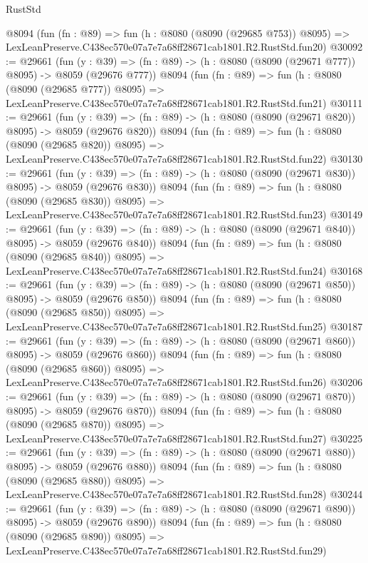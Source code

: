 \begin{lexlean}{RustStd}
\begin{coremodule}
    @8094
    (fun (fn : @89) =>
    fun (h : @8080 (@8090 (@29685 @753)) @8095) =>
    LexLeanPreserve.C438ec570e07a7e7a68ff28671cab1801.R2.RustStd.fun20)
@30092 := @29661
    (fun (y : @39) => (fn : @89) -> (h : @8080 (@8090 (@29671 @777)) @8095) -> @8059 (@29676 @777))
    @8094
    (fun (fn : @89) =>
    fun (h : @8080 (@8090 (@29685 @777)) @8095) =>
    LexLeanPreserve.C438ec570e07a7e7a68ff28671cab1801.R2.RustStd.fun21)
@30111 := @29661
    (fun (y : @39) => (fn : @89) -> (h : @8080 (@8090 (@29671 @820)) @8095) -> @8059 (@29676 @820))
    @8094
    (fun (fn : @89) =>
    fun (h : @8080 (@8090 (@29685 @820)) @8095) =>
    LexLeanPreserve.C438ec570e07a7e7a68ff28671cab1801.R2.RustStd.fun22)
@30130 := @29661
    (fun (y : @39) => (fn : @89) -> (h : @8080 (@8090 (@29671 @830)) @8095) -> @8059 (@29676 @830))
    @8094
    (fun (fn : @89) =>
    fun (h : @8080 (@8090 (@29685 @830)) @8095) =>
    LexLeanPreserve.C438ec570e07a7e7a68ff28671cab1801.R2.RustStd.fun23)
@30149 := @29661
    (fun (y : @39) => (fn : @89) -> (h : @8080 (@8090 (@29671 @840)) @8095) -> @8059 (@29676 @840))
    @8094
    (fun (fn : @89) =>
    fun (h : @8080 (@8090 (@29685 @840)) @8095) =>
    LexLeanPreserve.C438ec570e07a7e7a68ff28671cab1801.R2.RustStd.fun24)
@30168 := @29661
    (fun (y : @39) => (fn : @89) -> (h : @8080 (@8090 (@29671 @850)) @8095) -> @8059 (@29676 @850))
    @8094
    (fun (fn : @89) =>
    fun (h : @8080 (@8090 (@29685 @850)) @8095) =>
    LexLeanPreserve.C438ec570e07a7e7a68ff28671cab1801.R2.RustStd.fun25)
@30187 := @29661
    (fun (y : @39) => (fn : @89) -> (h : @8080 (@8090 (@29671 @860)) @8095) -> @8059 (@29676 @860))
    @8094
    (fun (fn : @89) =>
    fun (h : @8080 (@8090 (@29685 @860)) @8095) =>
    LexLeanPreserve.C438ec570e07a7e7a68ff28671cab1801.R2.RustStd.fun26)
@30206 := @29661
    (fun (y : @39) => (fn : @89) -> (h : @8080 (@8090 (@29671 @870)) @8095) -> @8059 (@29676 @870))
    @8094
    (fun (fn : @89) =>
    fun (h : @8080 (@8090 (@29685 @870)) @8095) =>
    LexLeanPreserve.C438ec570e07a7e7a68ff28671cab1801.R2.RustStd.fun27)
@30225 := @29661
    (fun (y : @39) => (fn : @89) -> (h : @8080 (@8090 (@29671 @880)) @8095) -> @8059 (@29676 @880))
    @8094
    (fun (fn : @89) =>
    fun (h : @8080 (@8090 (@29685 @880)) @8095) =>
    LexLeanPreserve.C438ec570e07a7e7a68ff28671cab1801.R2.RustStd.fun28)
@30244 := @29661
    (fun (y : @39) => (fn : @89) -> (h : @8080 (@8090 (@29671 @890)) @8095) -> @8059 (@29676 @890))
    @8094
    (fun (fn : @89) =>
    fun (h : @8080 (@8090 (@29685 @890)) @8095) =>
    LexLeanPreserve.C438ec570e07a7e7a68ff28671cab1801.R2.RustStd.fun29)

\end{coremodule}
\end{lexlean}
